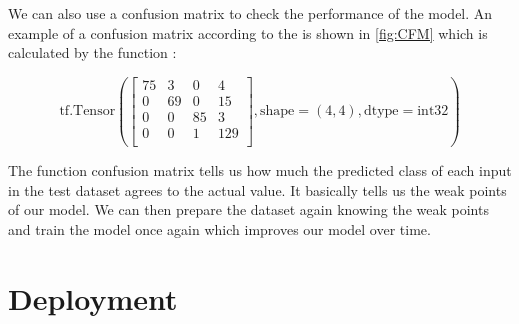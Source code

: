 We can also use a confusion matrix to check the performance of the model. An example of a confusion matrix according to the \cite{Warden:2020} is shown in \ref{fig:CFM} which is calculated by the function :

\begin{center}
    	\[
    \text{{tf.Tensor}} \left(
    \begin{bmatrix}
        75 & 3 & 0 & 4 \\
        0 & 69 & 0 & 15 \\
        0 & 0 & 85 & 3 \\
        0 & 0 & 1 & 129 \\
    \end{bmatrix},
    \text{{shape}}=(4, 4),
    \text{{dtype}}=\text{{int32}}
    \right)
    \]
    
    \label{fig:CFM}
\end{center}



The function confusion matrix tells us how much the predicted class of each input in the test dataset agrees to the actual value. It basically tells us the weak points of our model. We can then prepare the dataset again knowing the weak points and train the model once again  which improves our model over time. \cite{Warden:2020}









\section{Deployment}

